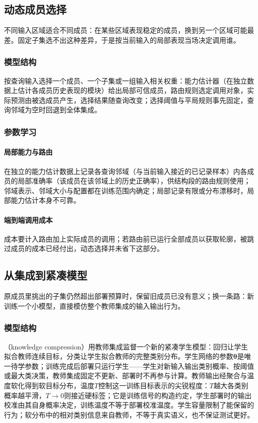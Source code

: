 \subsection{动态成员选择}
\label{sec:ensemble-dynamic-selection}

不同输入区域适合不同成员：在某些区域表现稳定的成员，换到另一个区域可能最差。固定子集选不出这种差异，于是按当前输入的局部表现当场决定调用谁。

\subsubsection{模型结构}
按查询输入选择一个成员、一个子集或一组输入相关权重：能力估计器（在独立数据上估计各成员历史表现的模块）给出局部可信成员，路由规则选定调用对象，实际预测由被选成员产生，选择结果随查询改变；选择阈值与平局规则事先固定，查询邻域为空时回退到全体集成。

\subsubsection{参数学习}

\paragraph{局部能力与路由}
在独立的能力估计数据上记录各查询邻域（与当前输入接近的已记录样本）内各成员的局部准确率（该成员在该邻域上的历史正确率），供结构段的路由规则使用；邻域表示、邻域大小与配置都在训练范围内确定；局部记录有限或分布漂移时，局部能力估计本身不可靠。

\paragraph{端到端调用成本}
成本要计入路由加上实际成员的调用；若路由前已运行全部成员以获取轮廓，被跳过成员的成本已经付出，动态选择并未省下这部分。

\subsection{从集成到紧凑模型}
\label{sec:ensemble-compression}

原成员里挑出的子集仍然超出部署预算时，保留旧成员已没有意义；换一条路：新训练一个小模型，直接模仿整个教师集成的输入输出行为。

\subsubsection{模型结构}
（knowledge compression）用教师集成监督一个新的紧凑学生模型：回归让学生拟合教师连续目标，分类让学生拟合教师的完整类别分布。学生网络的参数$\bm\theta$是唯一待学参数；训练完成后部署只运行学生——学生对新输入输出类别概率、按阈值或最大类决策，教师集成固定不更新、部署时不再参与计算。教师输出经聚合与温度软化得到软目标分布，温度$T$控制这一训练目标表示的尖锐程度：$T$越大各类别概率越平滑，$T\to0$则接近硬标签；它是训练信号的构造约定，学生部署时的输出校准由其自身概率决定，训练温度不等于部署校准温度。学生容量限制了能保留的行为；软分布中的相对类别信息来自教师，不等于真实语义，也不保证测试更好。


